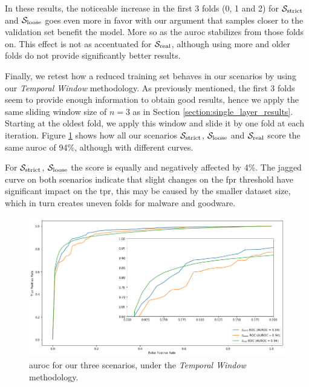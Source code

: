In these results, the noticeable increase in the first 3 folds (0, 1 and 2) for $\mathcal{S}_{\mathrm{strict}}$ and $\mathcal{S}_{\mathrm{loose}}$ goes even more in favor with our argument that samples closer to the validation set benefit the model.
More so as the \gls{auroc} stabilizes from those folds on.
This effect is not as accentuated for $\mathcal{S}_{\mathrm{real}}$, although using more and older folds do not provide significantly better results.

\medskip

Finally, we retest how a reduced training set behaves in our scenarios by using our \textit{Temporal Window} methodology.
As previously mentioned, the first 3 folds seem to provide enough information to obtain good results, hence we apply the same sliding window size of $n=3$ as in Section \ref{section:single_layer_results}.
Starting at the oldest fold, we apply this window and slide it by one fold at each iteration.
Figure \ref{fig:slidingwindow_modified} shows how all our scenarios $\mathcal{S}_{\mathrm{strict}}$, $\mathcal{S}_{\mathrm{loose}}$ and $\mathcal{S}_{\mathrm{real}}$ score the same \gls{auroc} of 94\%, although with different curves.

For $\mathcal{S}_{\mathrm{strict}}$, $\mathcal{S}_{\mathrm{loose}}$ the score is equally and negatively affected by 4\%.
The jagged curve on both scenarios indicate that slight changes on the \gls{fpr} threshold have significant impact on the \gls{tpr}, this may be caused by the smaller dataset size, which in turn creates uneven folds for malware and goodware.

\begin{figure}[!h]
	\centering
	\includegraphics[width=\columnwidth]{Figures/slidingwindow_improved.png}
	\caption[Multi layer results for dynamic features in \textit{Temporal Window}.]{\gls{auroc} for our three scenarios, under the \textit{Temporal Window} methodology.}
	\label{fig:slidingwindow_modified}
\end{figure}

